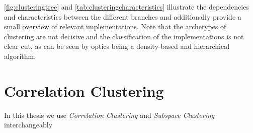 
\autoref{fig:clusteringtree} and \autoref{tab:clusteringcharacteristics} illustrate the dependencies and characteristics between the different branches and additionally provide a small overview of relevant implementations. Note that the archetypes of clustering are not decisive and the classification of the implementations is not clear cut, as can be seen by \acrshort{optics} being a density-based and hierarchical algorithm.


\section{Correlation Clustering}\label{sec:subspaceclu}

In this thesis we use \textit{Correlation Clustering} and \textit{Subspace Clustering} interchangeably
